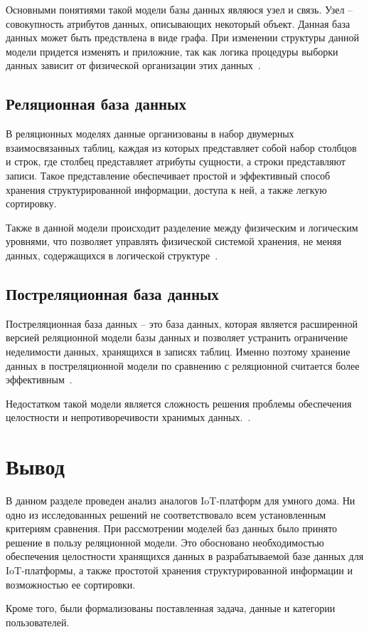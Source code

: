 Основными понятиями такой модели базы данных являюся узел и связь. Узел -- совокупность атрибутов данных, описывающих
некоторый объект. Данная база данных может быть предствлена в виде графа. При изменении структуры данной модели придется 
изменять и приложние, так как логика процедуры выборки данных зависит от физической организации этих данных~\cite{petr}.

\subsection{Реляционная база данных}
В реляционных моделях данные организованы в набор двумерных взаимосвязанных таблиц, 
каждая из которых представляет собой набор столбцов и строк, где столбец представляет атрибуты сущности, 
а строки представляют записи. Такое представление обеспечивает простой и эффективный способ хранения структурированной информации, 
доступа к ней, а также легкую сортировку.

Также в данной модели происходит разделение между физическим и логическим уровнями, что 
позволяет управлять физической системой хранения, не меняя данных, содержащихся в логической структуре~\cite{oracle}.

\subsection{Постреляционная база данных}

Постреляционная база данных -- это база данных, которая является расширенной версией реляционной 
модели базы данных и позволяет устранить ограничение неделимости данных, хранящихся 
в записях таблиц. Именно поэтому хранение данных в постреляционной модели по сравнению 
с реляционной считается более эффективным~\cite{fedor}.

Недостатком такой модели является сложность решения проблемы обеспечения целостности и непротиворечивости хранимых данных.~\cite{microsoft}.

\section*{Вывод}

В данном разделе проведен анализ аналогов IoT-платформ для умного дома.
Ни одно из исследованных решений не соответствовало всем установленным критериям сравнения. 
При рассмотрении моделей баз данных было принято решение в пользу реляционной модели. 
Это обосновано необходимостью обеспечения целостности хранящихся данных в разрабатываемой базе данных 
для IoT-платформы, а также простотой хранения структурированной информации и возможностью ее сортировки.

Кроме того, были формализованы поставленная задача, данные и категории пользователей.
